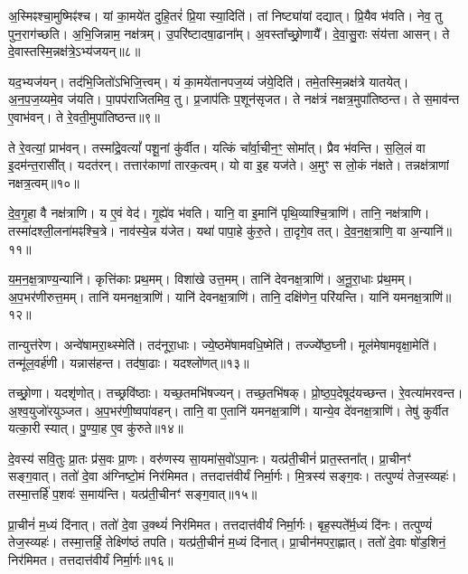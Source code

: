 अ॒स्मिꣴश्चा॒मुष्मिꣴ॑श्च।
यां का॒मये॑त दुहि॒तरं॑ प्रि॒या स्या॒दिति॑।
तां निष्ट्या॑यां दद्यात्।
प्रि॒यैव भ॑वति।
नेव॒ तु पुन॒राग॑च्छति।
अ॒भि॒जिन्नाम॒ नक्ष॑त्रम्।
उ॒परि॑ष्टादषा॒ढाना᳚म्।
अ॒वस्ता᳚च्छ्रो॒णायै᳚।
दे॒वा॒सु॒राः संय॑त्ता आसन्।
ते दे॒वास्तस्मि॒न्नक्ष॑त्रे॒\-ऽभ्य॑जयन्॥८॥\ip

यद॒भ्यज॑यन्।
तद॑भि॒जितो॑\-ऽभिजि॒त्त्वम्।
यं का॒मये॑तानप\-ज॒य्यं ज॑ये॒दिति॑।
तमे॒तस्मि॒न्नक्ष॑त्रे यातयेत्।
अ॒न॒प॒ज॒य्यमे॒व ज॑यति।
पा॒पप॑राजितमिव॒ तु।
प्र॒जा\-प॑तिः प॒शून॑\-सृजत।
ते नक्ष॑त्रं नक्षत्र॒मुपा॑तिष्ठन्त।
ते स॒माव॑न्त ए॒वाभ॑वन्।
ते रे॒वती॒मुपा॑तिष्ठन्त॥९॥\ip

ते रे॒वत्यां॒ प्राभ॑वन्।
तस्मा᳚द्रे॒वत्यां᳚ पशू॒नां कु॑र्वीत।
यत्किं चा᳚र्वा॒चीन॒ꣳ॒ सोमा᳚त्।
प्रैव भ॑वन्ति।
स॒लि॒लं वा इ॒दम॑न्त॒रासी᳚त्।
यदत॑रन्।
तत्तार॑काणां तारक॒त्वम्।
यो वा इ॒ह यज॑ते।
अ॒मुꣳ स लो॒कं न॑क्षते।
तन्नक्ष॑त्राणां नक्षत्र॒त्वम्॥१०॥\ip

दे॒व॒गृ॒हा वै नक्ष॑त्राणि।
य ए॒वं वेद॑।
गृ॒ह्ये॑व भ॑वति।
यानि॒ वा इ॒मानि॑ पृथि॒व्याश्चि॒त्राणि॑।
तानि॒ नक्ष॑त्राणि।
तस्मा॑दश्ली॒लना॑मꣴश्चि॒त्रे।
नाव॑स्ये॒न्न य॑जेत।
यथा॑ पापा॒हे कु॑रु॒ते।
ता॒दृगे॒व तत्।
दे॒व॒न॒क्ष॒त्राणि॒ वा अ॒न्यानि॑॥११॥\ip

य॒म॒न॒क्ष॒त्राण्य॒न्यानि॑।
कृत्ति॑काः प्रथ॒मम्।
विशा॑खे उत्त॒मम्।
तानि॑ देवनक्ष॒त्राणि॑।
अ॒नू॒रा॒धाः प्र॑थ॒मम्।
अ॒प॒भर॑णीरुत्त॒मम्।
तानि॑ यमनक्ष॒त्राणि॑।
यानि॑ देवनक्ष॒त्राणि॑।
तानि॒ दक्षि॑णेन॒ परि॑यन्ति।
यानि॑ यमनक्ष॒त्राणि॑॥१२॥\ip

तान्युत्त॑रेण।
अन्वे॑षामरा॒थ्स्मेति॑।
तद॑नूरा॒धाः।
ज्ये॒ष्ठमे॑षाम\-वधि॒ष्मेति॑।
तज्ज्ये᳚ष्ठ॒घ्नी।
मूल॑मेषामवृक्षा॒मेति॑।
तन्मू॑ल॒वर्\mbox{}ह॑णी।
यन्नास॑हन्त।
तद॑षा॒ढाः।
यदश्लो॑णत्॥१३॥\ip

तच्छ्रो॒णा।
यदशृ॑णोत्।
तच्छ्रवि॑ष्ठाः।
यच्छ॒तमभि॑षज्यन्।
तच्छ॒तभि॑षक्।
प्रो॒ष्ठ॒प॒देषूद॑यच्छन्त।
रे॒वत्या॑मरवन्त।
अ॒श्व॒युजो॑र\-युञ्जत।
अ॒प॒भर॑णी॒ष्वपा॑वहन्।
तानि॒ वा ए॒तानि॑ यमनक्ष॒त्राणि॑।
यान्ये॒व दे॑वनक्ष॒त्राणि॑।
तेषु॑ कुर्वीत यत्का॒री स्यात्।
पु॒ण्या॒ह ए॒व कु॑रुते॥१४॥\ip{}

दे॒वस्य॑ सवि॒तुः प्रा॒तः प्र॑स॒वः प्रा॒णः।
वरु॑णस्य सा॒यमा॑स॒वो॑\-ऽपा॒नः।
यत्प्र॑ती॒चीनं॑ प्रात॒स्तना᳚त्।
प्रा॒चीनꣳ॑ सङ्ग॒वात्।
ततो॑ दे॒वा अ॑ग्निष्टो॒मं निर॑मिमत।
तत्तदात्त॑वीर्यं निर्मा॒र्गः।
मि॒त्रस्य॑ सङ्ग॒वः।
तत्पुण्यं॑ तेज॒स्व्यहः॑।
तस्मा॒त्तर्\mbox{}हि॑ प॒शवः॑ स॒माय॑न्ति।
यत्प्र॑ती॒चीनꣳ॑ सङ्ग॒वात्॥१५॥\ip

प्रा॒चीनं॑ म॒ध्यं दि॑नात्।
ततो॑ दे॒वा उ॒क्थ्यं॑ निर॑मिमत।
तत्तदात्त॑वीर्यं निर्मा॒र्गः।
बृह॒स्पते᳚र्म॒ध्यं दि॑नः।
तत्पुण्यं॑ तेज॒स्व्यहः॑।
तस्मा॒त्तर्\mbox{}हि॒ तेक्ष्णि॑ष्ठं तपति।
यत्प्र॑ती॒चीनं॑ म॒ध्यं दि॑नात्।
प्रा॒चीन॑\-मपरा॒ह्णात्।
ततो॑ दे॒वाः षो॑ड॒शिनं॒ निर॑मिमत।
तत्तदात्त॑वीर्यं निर्मा॒र्गः॥१६॥\ip

